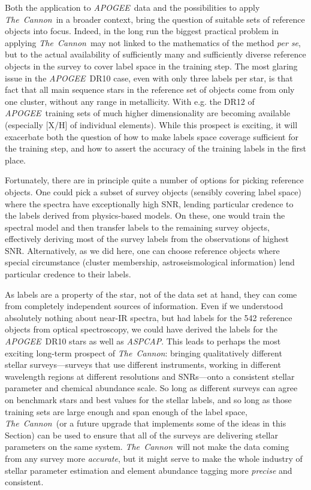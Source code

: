 \documentclass[12pt, preprint]{aastex}
\newcommand{\sectionname}{Section}
\newcommand{\tc}{\textsl{The~Cannon}}
\newcommand{\apogee}{\textsl{APOGEE}}
\newcommand{\aspcap}{\textsl{ASPCAP}}
\begin{document}
Both the application to \apogee\ data and the possibilities to apply \tc\ in a broader context, bring the question of suitable sets of reference objects into focus. Indeed, in the long run the biggest practical problem in applying \tc\ may not linked to the mathematics of the method \textit{per se}, but to the actual availability of sufficiently many and sufficiently diverse reference objects in the survey to cover label space in the training step. The most glaring issue in the \apogee\ DR10 case, even with only three labels per star, is that fact that all main sequence stars in the reference set of objects come from only one cluster, without any range in metallicity. With e.g. the DR12 of \apogee\ training sets of much higher dimensionality are becoming available (especially [X/H] of individual elements). While this prospect is exciting, it will exacerbate both the question of how to make labels space coverage sufficient for the training step, and how to assert the accuracy of the training labels in the first place. 

Fortunately, there are in principle quite a number of options for picking reference objects. One could pick a subset of survey objects (sensibly covering label space) where the spectra have exceptionally high SNR, 
lending particular credence to the labels derived from physics-based models. On these, one would train the spectral model and then transfer labels to the remaining survey objects, effectively deriving most of the survey labels from the observations of highest SNR.
Alternatively, as we did here, one can choose reference objects where special circumstance (cluster membership, astroseismological information) lend particular credence to their labels. 

As labels are a property of the star, not of the data set at hand, they can come from completely independent sources of information. Even if we understood absolutely nothing about near-IR spectra, but had labels for the 542 reference objects from optical spectroscopy, we could have derived the labels for the \apogee\ DR10 stars as well as \aspcap. This leads to perhaps the most exciting long-term prospect of \tc : bringing
qualitatively different stellar surveys---surveys that use different
instruments, working in different wavelength regions at different
resolutions and SNRs---onto a consistent stellar parameter and
chemical abundance scale.
So long as different surveys can agree on benchmark stars and best
values for the stellar labels, and so long as those training sets are
large enough and span enough of the label space, \tc\ (or a future
upgrade that implements some of the ideas in this \sectionname) can be
used to ensure that all of the surveys are delivering stellar
parameters on the same system.
\tc\ will not make the data coming from any survey more
\emph{accurate}, but it might serve to make the whole industry of
stellar parameter estimation and element abundance tagging more \emph{precise} and consistent.
\end{document}
